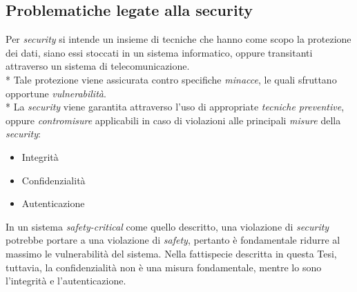 \subsection{Problematiche legate alla security}
Per \emph{security} si intende un insieme di tecniche che hanno come scopo la protezione dei dati, siano essi stoccati in un sistema informatico, oppure transitanti attraverso un sistema di telecomunicazione.\\*
Tale protezione viene assicurata contro specifiche \emph{minacce}, le quali sfruttano opportune \emph{vulnerabilit\`a}.\\*
La \emph{security} viene garantita attraverso l'uso di appropriate \emph{tecniche preventive}, oppure \emph{contromisure} applicabili in caso di violazioni alle principali \emph{misure} della \emph{security}:
\begin{itemize}
	\item Integrit\`a
	\item Confidenzialit\`a
	\item Autenticazione
\end{itemize}
In un sistema \emph{safety-critical} come quello descritto, una violazione di \emph{security} potrebbe portare a una violazione di \emph{safety}, pertanto \`e fondamentale ridurre al massimo le vulnerabilit\`a del sistema.
Nella fattispecie descritta in questa Tesi, tuttavia, la confidenzialit\`a non \`e una misura fondamentale, mentre lo sono l'integrit\`a e l'autenticazione.
